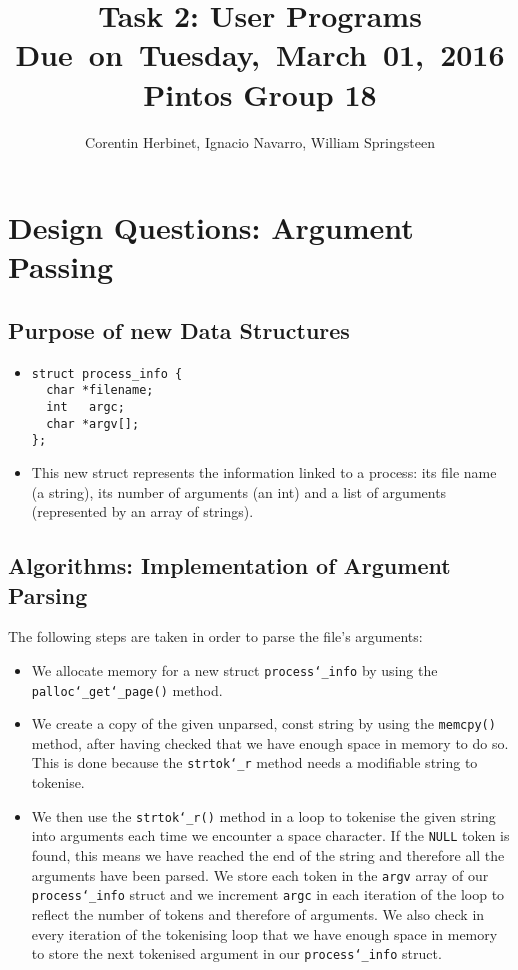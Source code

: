 \documentclass{article}
\title{
\vspace{2in}
\textmd{\textbf{Task 2: User Programs}}\\
\normalsize\vspace{0.1in}\small{Due\ on\ Tuesday,\ March\ 01,\ 2016}\\
\vspace{0.1in}\large{\textbf{Pintos Group 18}}
\vspace{3in}
}
\author{Corentin Herbinet, Ignacio Navarro, William Springsteen}
\date{}
\renewcommand{\_}{\char`_}
\begin{document}
\maketitle
\newpage

\section{Design Questions: Argument Passing}

\subsection{Purpose of new Data Structures}

\begin{itemize}
\item \begin{lstlisting}
struct process_info {
  char *filename;
  int   argc;
  char *argv[];
};
\end{lstlisting}

\item This new struct represents the information linked to a process: its file name (a string), its number of arguments (an int) and a list of arguments (represented by an array of strings). 
\end{itemize}


\subsection{Algorithms: Implementation of Argument Parsing}

The following steps are taken in order to parse the file's arguments:

\begin{itemize}

\item We allocate memory for a new struct \texttt{process\_info} by using the \texttt{palloc\_get\_page()} method.
\item We create a copy of the given unparsed, const string by using the \texttt{memcpy()} method, after having checked that we have enough space in memory to do so. This is done because the \texttt{strtok\_r} method needs a modifiable string to tokenise.
\item We then use the \texttt{strtok\_r()} method in a loop to tokenise the given string into arguments each time we encounter a space character. If the \texttt{NULL} token is found, this means we have reached the end of the string and therefore all the arguments have been parsed. We store each token in the \texttt{argv} array of our \texttt{process\_info} struct and we increment \texttt{argc} in each iteration of the loop to reflect the number of tokens and therefore of arguments. We also check in every iteration of the tokenising loop that we have enough space in memory to store the next tokenised argument in our \texttt{process\_info} struct.

\end{itemize}
\end{document}
